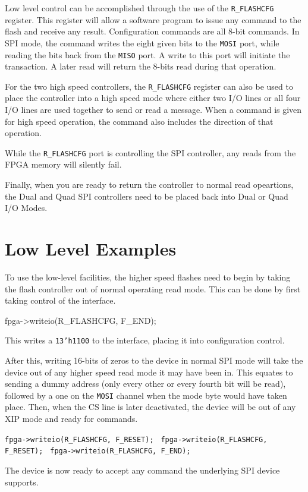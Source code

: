 \documentclass{gqtekspec}
\begin{document}
Low level control can be accomplished through the use of the {\tt R\_FLASHCFG}
register.  This register will allow a software program to issue any command
to the flash and receive any result. Configuration commands are all 8-bit
commands.  In SPI mode, the command writes the eight given bits to the
{\tt MOSI} port, while reading the bits back from the {\tt MISO} port.
A write to this port will initiate the transaction.  A later read will return
the 8-bits read during that operation.

For the two high speed controllers, the {\tt R\_FLASHCFG} register can also
be used to place the controller into a high speed mode where either two
I/O lines or all four I/O lines are used together to send or read a message.
When a command is given for high speed operation, the command also includes
the direction of that operation.

While the {\tt R\_FLASHCFG} port is controlling the SPI controller, any
reads from the FPGA memory will silently fail.

Finally, when you are ready to return the controller to normal read
opeartions, the Dual and Quad SPI controllers need to be placed back into
Dual or Quad I/O Modes.

\section{Low Level Examples}

To use the low-level facilities, the higher speed flashes need to begin by
taking the flash controller out of normal operating read mode.  This can
be done by first taking control of the interface.

fpga->writeio(R\_FLASHCFG, F\_END);

This writes a {\tt 13'h1100} to the interface, placing it into configuration
control.

After this, writing 16-bits of zeros to the device in normal SPI mode will
take the device out of any higher speed read mode it may have been in.  This
equates to sending a dummy address (only every other or every fourth bit will
be read), followed by a one on the {\tt MOSI} channel when the mode byte would
have taken place.  Then, when the CS line is later deactivated,
the device will be out of any XIP mode and ready for commands.

{\tt fpga->writeio(R\_FLASHCFG, F\_RESET); }
{\tt fpga->writeio(R\_FLASHCFG, F\_RESET); }
{\tt fpga->writeio(R\_FLASHCFG, F\_END); }

The device is now ready to accept any command the underlying SPI device
supports.
\end{document}
